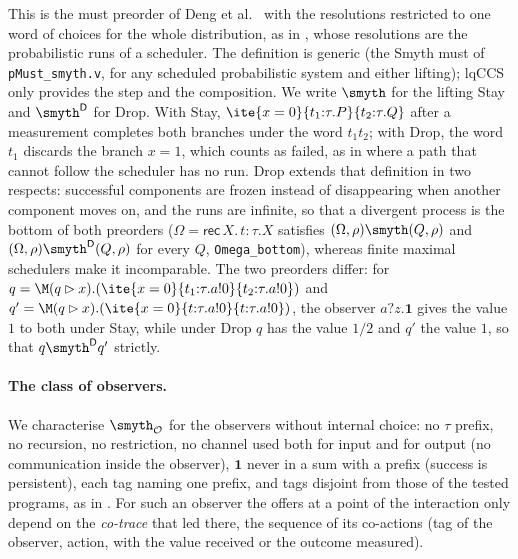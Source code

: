 This is the must preorder of Deng et al.~\cite{DvGHM08} with the
resolutions restricted to one word of choices for the whole distribution,
as in \cite[Definition 7]{Ceragioli27}, whose resolutions are the
probabilistic runs of a scheduler. The definition is generic (the Smyth
must of \texttt{pMust\_smyth.v}, for any scheduled probabilistic system
and either lifting); lqCCS only provides the step and the composition. We
write $\smyth$ for the lifting Stay and $\smyth^{\mathsf{D}}$ for Drop.
With Stay, $\ite{x = 0}{t_1{:}\tau.P}{t_2{:}\tau.Q}$ after a measurement
completes both branches under the word $t_1 t_2$; with Drop, the word $t_1$
discards the branch $x = 1$, which counts as failed, as in
\cite{Ceragioli27} where a path that cannot follow the scheduler has no
run. Drop extends that definition in two respects: successful components
are frozen instead of disappearing when another component moves on, and
the runs are infinite, so that a divergent process is the bottom of both
preorders ($\Omega = \mathsf{rec}\,X.\,t{:}\tau.X$ satisfies $(\Omega,
\rho) \smyth (Q, \rho)$ and $(\Omega, \rho) \smyth^{\mathsf{D}} (Q, \rho)$
for every $Q$, \texttt{Omega\_bottom}), whereas finite maximal schedulers make
it incomparable. The two preorders differ: for
$q = \M(q \rhd x).(\ite{x=0}{t_1{:}\tau.a!0}{t_2{:}\tau.a!0})$ and
$q' = \M(q \rhd x).(\ite{x=0}{t{:}\tau.a!0}{t{:}\tau.a!0})$, the observer
$a?z.\mathbf{1}$ gives the value $1$ to both under Stay, while under Drop
$q$ has the value $1/2$ and $q'$ the value $1$, so that
$q \smyth^{\mathsf{D}} q'$ strictly.

\paragraph{The class of observers.} We characterise ${\smyth}_{\mathcal{O}}$
for the observers without internal choice: no $\tau$ prefix, no recursion,
no restriction, no channel used both for input and for output (no
communication inside the observer), $\mathbf{1}$ never in a sum with a
prefix (success is persistent), each tag naming one prefix, and tags
disjoint from those of the tested programs, as in \cite{Ceragioli27}.
For such an observer the offers at a point of the interaction only depend on
the \emph{co-trace} that led there, the sequence of its co-actions (tag of
the observer, action, with the value received or the outcome measured).

